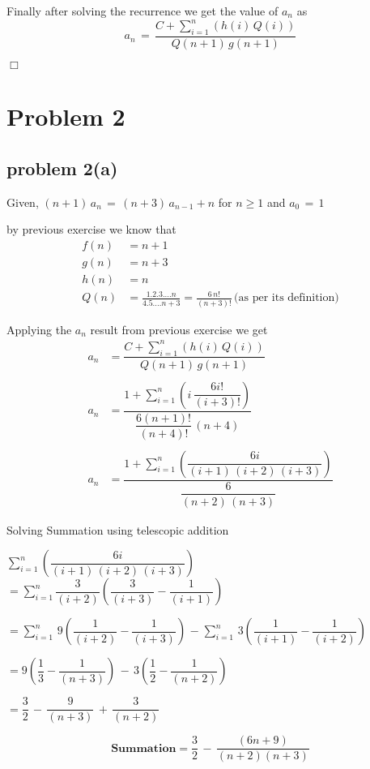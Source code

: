 \documentclass{article}
\newcommand{\qed}{\hfill \ensuremath{\Box}}
\begin{document}
Finally after solving the recurrence we get the value of $a_{n}$ as
$$a_{n}\,=\,\frac{C+\displaystyle\sum_{i=1}^{n}(h(i)\,Q(i))}{Q(n+1)\,g(n+1)}$$
\null \par  \null 
\qed

\newpage
\section*{Problem 2}
\subsection*{problem 2(a)}
\noindent Given, $(n+1)\,a_{n}\,=\,(n+3)\,a_{n-1}+n$ for $n\geq 1$
and $a_0\,=\,1$
\null \par \null
\noindent by previous exercise we know that
\begin{align*}
 f(n) &= n+1 \\
 g(n) &= n+3 \\
 h(n) &= n   \\
 Q(n) &= \frac{1.2.3....n}{4.5....n+3} = \frac{6\,n!}{(n+3)!} \,  
 \text{(as per its definition)}
\end{align*}

Applying the $a_n$ result from previous exercise we get
\begin{align*}
 a_{n} &= \dfrac{C+\displaystyle\sum_{i=1}^{n}(h(i)\,Q(i))}{Q(n+1)\,g(n+1)} \\ \\
 a_{n} &= \dfrac{1+\displaystyle\sum_{i=1}^{n}\left(i\,\dfrac{6i!}{(i+3)!}\right)}
 {\dfrac{6(n+1)!}{(n+4)!}\,(n+4)} \\ \\ 
 a_{n} &= \dfrac{1+\displaystyle\sum_{i=1}^{n}
\left(\dfrac{6i}{(i+1)\,(i+2)\,(i+3)}\right)} {\dfrac{6}{(n+2)\,(n+3)}} 
\end{align*}

Solving Summation using telescopic addition
\null \par \null
$\displaystyle\sum_{i=1}^{n}\left(\dfrac{6i}{(i+1)\,(i+2)\,(i+3)}\right)$
$=\displaystyle\sum_{i=1}^{n}\dfrac{3}{(i+2)}\left(\dfrac{3}{(i+3)}-\dfrac{1}{(i+1)}\right)$
\\ \null \par \null 
$=\displaystyle\sum_{i=1}^{n}\,9\left(\dfrac{1}{(i+2)}-\dfrac{1}{(i+3)}\right)$
$-\;\displaystyle\sum_{i=1}^{n}\,3\left(\dfrac{1}{(i+1)}-\dfrac{1}{(i+2)}\right)$

\newpage

$=9\left(\dfrac{1}{3}-\dfrac{1}{(n+3)}\right)\,-\,3\left(\dfrac{1}{2}-\dfrac{1}{(n+2)}\right)$
\\ \null \par \null 
$=\dfrac{3}{2}\,-\,\dfrac{9}{(n+3)}\,+\,\dfrac{3}{(n+2)}$
\\ \null \par \null 
$$\textbf{Summation}=\dfrac{3}{2}\,-\,\dfrac{(6n+9)}{(n+2)(n+3)}$$
\\ \null \par \null 
\end{document}
